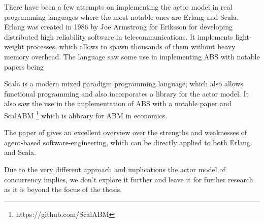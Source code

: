 There have been a few attempts on implementing the actor model in real programming languages where the most notable ones are Erlang and Scala. Erlang was created in 1986 by Joe Armstrong for Eriksson for developing distributed high reliability software in telecommunications. It implements light-weight processes, which allows to spawn thousands of them without heavy memory overhead. The language saw some use in implementing ABS with notable papers being \cite{di_stefano_using_2005, di_stefano_exat:_2007, varela_modelling_2004, sher_agent-based_2013, bezirgiannis_improving_2013}

Scala is a modern mixed paradigm programming language, which also allows functional programming and also incorporates a library for the actor model. It also saw the use in the implementation of ABS with a notable paper \cite{krzywicki_massively_2015} and ScalABM \footnote{https://github.com/ScalABM} which is alibrary for ABM in economics.

The paper of \cite{jennings_agent-based_2000} gives an excellent overview over the strengths and weaknesses of agent-based software-engineering, which can be directly applied to both Erlang and Scala.

Due to the very different approach and implications the actor model of concurrency implies, we don't explore it further and leave it for further research as it is beyond the focus of the thesis.




